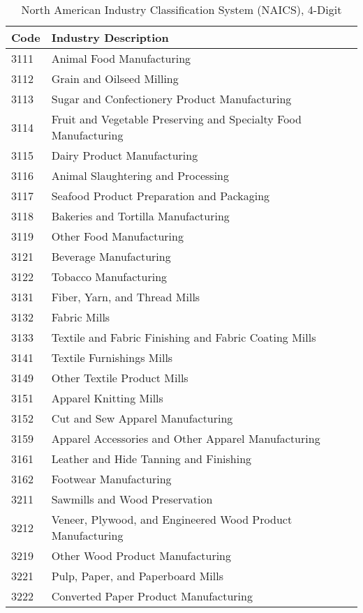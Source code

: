 \documentclass[11pt]{article}
\begin{document}
\begin{spacing}{1}
\begin{table}[ht] 
\caption{North American Industry Classification System (NAICS), 4-Digit} 
\tiny  
\begin{tabular} { ll } \\ 
\textbf{Code} & \textbf{Industry Description}	 \\ \hline\hline		
3111   &  Animal Food Manufacturing \\
3112   &  Grain and Oilseed Milling \\
3113   &  Sugar and Confectionery Product Manufacturing \\
3114   &  Fruit and Vegetable Preserving and Specialty Food Manufacturing \\
3115   &  Dairy Product Manufacturing \\
3116   &  Animal Slaughtering and Processing \\
3117   &  Seafood Product Preparation and Packaging \\
3118   &  Bakeries and Tortilla Manufacturing \\
3119   &  Other Food Manufacturing \\
3121   &  Beverage Manufacturing \\
3122   &  Tobacco Manufacturing \\
3131   &  Fiber, Yarn, and Thread Mills \\
3132   &  Fabric Mills \\
3133   &  Textile and Fabric Finishing and Fabric Coating Mills \\
3141   &  Textile Furnishings Mills \\
3149   &  Other Textile Product Mills \\
3151   &  Apparel Knitting Mills \\
3152   &  Cut and Sew Apparel Manufacturing \\
3159   &  Apparel Accessories and Other Apparel Manufacturing \\
3161   &  Leather and Hide Tanning and Finishing \\
3162   &  Footwear Manufacturing \\
3211   &  Sawmills and Wood Preservation \\
3212   &  Veneer, Plywood, and Engineered Wood Product Manufacturing \\
3219   &  Other Wood Product Manufacturing \\
3221   &  Pulp, Paper, and Paperboard Mills \\
3222   &  Converted Paper Product Manufacturing \\

\end{tabular}
\end{table}
\end{spacing}
\end{document}
